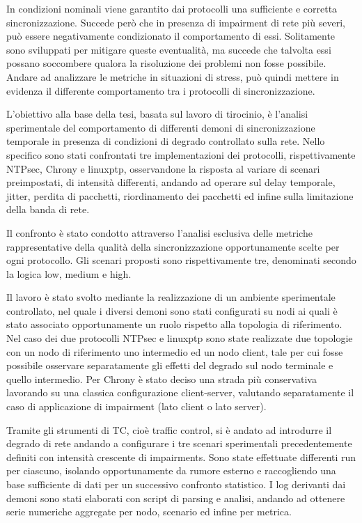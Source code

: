In condizioni nominali viene garantito dai protocolli una sufficiente e corretta sincronizzazione.
Succede però che in presenza di impairment di rete più severi, può essere negativamente condizionato 
il comportamento di essi.
Solitamente sono sviluppati per mitigare queste eventualità, ma succede che talvolta essi possano
soccombere qualora la risoluzione dei problemi non fosse possibile. Andare ad analizzare 
le metriche in situazioni di stress, può quindi mettere in evidenza il differente comportamento
tra i protocolli di sincronizzazione.

L'obiettivo alla base della tesi, basata sul lavoro di tirocinio, è l'analisi sperimentale del comportamento di differenti
demoni di sincronizzazione temporale in presenza di condizioni di degrado controllato
sulla rete. Nello specifico sono stati confrontati tre implementazioni dei protocolli, rispettivamente
NTPsec, Chrony e linuxptp, osservandone la risposta al variare di scenari preimpostati,
di intensità differenti, andando ad operare sul delay temporale, jitter, perdita di
pacchetti, riordinamento dei pacchetti ed infine sulla limitazione della banda
di rete.

Il confronto è stato condotto attraverso l'analisi esclusiva delle metriche
rappresentative della qualità della sincronizzazione opportunamente scelte per
ogni protocollo. Gli scenari proposti sono rispettivamente tre, denominati
secondo la logica low, medium e high.

Il lavoro è stato svolto mediante la realizzazione di un ambiente sperimentale controllato,
nel quale i diversi demoni sono stati configurati su nodi ai quali è stato
associato opportunamente un ruolo rispetto alla topologia di riferimento. Nel caso
dei due protocolli NTPsec e linuxptp sono state realizzate due topologie con un nodo
di riferimento uno intermedio ed un nodo client, tale per cui fosse possibile
osservare separatamente gli effetti del degrado sul nodo terminale e quello
intermedio. Per Chrony è stato deciso una strada più conservativa lavorando su una
classica configurazione client-server, valutando separatamente il caso di
applicazione di impairment (lato client o lato server).

Tramite gli strumenti di TC, cioè traffic control, si è andato ad introdurre
il degrado di rete andando a configurare i tre scenari sperimentali precedentemente definiti con intensità
crescente di impairments. 
Sono state effettuate differenti run per ciascuno, isolando opportunamente da rumore esterno e 
raccogliendo una base sufficiente di dati per un successivo confronto statistico.
I log derivanti dai demoni sono stati elaborati con script di parsing e analisi, 
andando ad ottenere serie numeriche aggregate per nodo, scenario ed infine per metrica.

